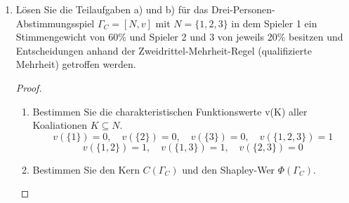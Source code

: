 \documentclass[12pt]{extreport} %
\theoremstyle{named}
\theoremstyle{itshape}
\theoremstyle{normal}
\begin{document}
\begin{enumerate}
\begin{proof}
\begin{center}
\begin{tabular}{| c | c | c | c |}
      						\hline
    					3, 1, \deleted{\color{red}{2}} & $1$ & $0$ & $0$  \\
      						\hline
    					3, \deleted{\color{red}{2, 1}} & $0$ & $0$ & $0$  \\
      						\hline \hline
    					$\phi_{i}(\Sigma_{C}) = \Sigma$  & $2$ & $1$ & $1$  \\
    				\hline
   				 \end{tabular}
    		\end{center}
    		d.h. $\Phi(\Sigma_{C}) = \left(\frac{2}{c}, \frac{1}{c}, \frac{1}{c} \right)$; die Frage bleibt aber, welchen Wert $c$ annehmen muss. Mein Tipp wäre $\frac{v(N)}{\sum \phi_{i}(\Sigma_{C})}$\footnote{Scheint mir nicht ganz konsistent mit der Vorlesung $(1/n!)$ zu sein}. Laut Musterlösung gilt $c = 4$ was konsistent mit meiner Vermutung wäre.
		\end{proof}
	\item Lösen Sie die Teilaufgaben a) und b) für das Drei-Personen-Abstimmungsspiel $\Gamma_C = [N, v]$ mit $N = \{1, 2, 3\}$ in dem Spieler 1 ein Stimmengewicht von 60\% und Spieler 2 und 3 von jeweils 20\% besitzen und Entscheidungen anhand der Zweidrittel-Mehrheit-Regel (qualifizierte Mehrheit) getroffen werden.
	  \begin{proof}
	  ~\\
		\begin{enumerate} 
			\item Bestimmen Sie die charakteristischen Funktionswerte v(K) aller Koaliationen $K \subseteq N$.
			$$ v(\{ 1 \}) = 0, \quad v(\{ 2 \}) = 0, \quad v(\{ 3 \}) = 0, \quad v(\{ 1, 2, 3 \}) = 1  $$
			$$ v(\{ 1, 2 \}) = 1, \quad  v(\{ 1, 3 \}) = 1, \quad v(\{ 2, 3 \}) = 0 $$
			\item Bestimmen Sie den Kern $C(\Gamma_C)$ und den Shapley-Wer $\Phi(\Gamma_C)$. \\
			

\end{enumerate}
\end{proof}
\end{enumerate}
\end{document}

